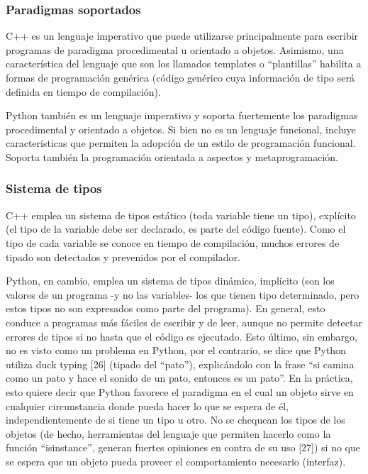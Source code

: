 \documentclass[]{article}
\begin{document}
\subsubsection{Paradigmas soportados}

C++ es un lenguaje imperativo que puede utilizarse principalmente para escribir
programas de paradigma procedimental u orientado a objetos. Asimismo, una
característica del lenguaje que son los llamados templates o ``plantillas''
habilita a formas de programación genérica (código genérico cuya información de
tipo será definida en tiempo de compilación).

Python también es un lenguaje imperativo y soporta fuertemente los paradigmas
procedimental y orientado a objetos. Si bien no es un lenguaje funcional,
incluye características que permiten la adopción de un estilo de programación
funcional. Soporta también la programación orientada a aspectos y
metaprogramación.

\subsubsection{Sistema de tipos}

C++ emplea un sistema de tipos estático (toda variable tiene un tipo),
explícito (el tipo de la variable debe ser declarado, es parte del código
fuente). Como el tipo de cada variable se conoce en tiempo de compilación,
muchos errores de tipado son detectados y prevenidos por el compilador.

Python, en cambio, emplea un sistema de tipos dinámico, implícito (son los
valores de un programa -y no las variables- los que tienen tipo determinado,
pero estos tipos no son expresados como parte del programa). En general, esto
conduce a programas más fáciles de escribir y de leer, aunque no permite
detectar errores de tipos si no hasta que el código es ejecutado. Esto último,
sin embargo, no es visto como un problema en Python, por el contrario, se dice
que Python utiliza duck typing [26] (tipado del ``pato''), explicándolo con la
frase ``si camina como un pato y hace el sonido de un pato, entonces es un
pato''. En la práctica, esto quiere decir que Python favorece el paradigma en el
cual un objeto sirve en cualquier circunstancia donde pueda hacer lo que se
espera de él, independientemente de si tiene un tipo u otro. No se chequean los
tipos de los objetos (de hecho, herramientas del lenguaje que permiten hacerlo
como la función ``isinstance'', generan fuertes opiniones en contra de su uso
[27]) si no que se espera que un objeto pueda proveer el comportamiento
necesario (interfaz).
\end{document}
